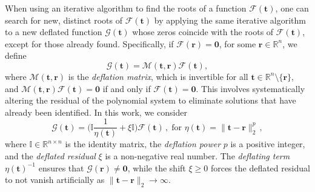 \documentclass[11pt]{amsart}
\newcommand{\R}{\mathbb{R}}
\theoremstyle{definition}
\theoremstyle{remark}
\numberwithin{equation}{section}
\begin{document}
When using an iterative algorithm to find the roots of a function $\mathcal{F}(\bm{t})$, one can search for new, distinct roots of $\mathcal{F}(\bm{t})$ by applying the same iterative algorithm to a new deflated function $\mathcal{G}( {\bm t})$ whose zeros coincide with the roots of $\mathcal{F}( {\bm t})$, except for those already found.
Specifically, if $\mathcal{F}(\bm{r})=\bm{0}$, for some $\bm r\in\R^n$, we define
\begin{equation*}
\mathcal{G}(\bm{t}) =\mathcal{M}(\bm{t}, \bm{r})\mathcal{F}(\bm{t}),
\end{equation*}
where $\mathcal{M}(\bm{t}, \bm{r} )$ is the \emph{deflation matrix}, which is invertible for all $\bm{t}\in \mathbb{R}^n\setminus\{\bm{r}\}$, and $\mathcal{M}(\bm{t}, \bm{r} )\mathcal{F}(\bm{t}) = \bm{0}$ if and only if $\mathcal{F}(\bm{t})=\bm{0}$. 
This involves systematically altering the residual of the polynomial system to eliminate solutions that have already been identified. In this work, we consider 
\begin{equation}\label{defl}
\mathcal{G}(\bm{t}) = \bigg(\mathbb{I}\frac{1}{\eta(\bm{t})} + \xi\mathbb{I}\bigg)\mathcal{F}(\bm{t})\,,\; \text{for } \eta(\bm{t}) = \|\bm{t} - \bm{r} \|_2^p\,,
\end{equation}
 where $\mathbb{I}\in\mathbb{R}^{n\times n}$ is the identity matrix, {the \emph{deflation power} $p$ is a positive integer, and the \emph{deflated residual} $\xi$ is a non-negative real number. }
 The \emph{deflating term} $\eta(\bm{t})^{-1}$ ensures that $\mathcal{G}( \bm{r} )\neq \bm{0}$, while the shift $\xi\geq0$ forces the deflated residual to not vanish artificially as $ \|\bm{t} - \bm{r} \|_2\to\infty$. 
 
\end{document}
